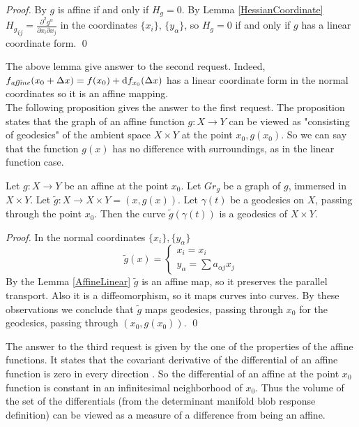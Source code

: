 \documentclass[twocolumn]{svjour3}          %
\newcommand{\affine}{\mathop{\it affine}}
\newcommand{\delx}{\Delta x}
\newcommand{\Diff}{\mathrm{d}}
\begin{document}
\begin{proof}
By \cite{GeodesicMaps} $g$ is affine if and only if $H_g = 0$. By Lemma \ref{HessianCoordinate} ${H_g}_{ij} = \frac{\partial^2 g^{\alpha}}{\partial x_i \partial x_j}$ in the coordinates  $\{x_i\}$, $\{y_{\alpha}\}$, so $H_g = 0$ if and only if $g$ has a linear coordinate form. \qed
\end{proof}

The above lemma give answer to the second request. Indeed, $f_{\affine}(x_0 + \delx)=f(x_0) + \Diff f_{x_0}(\delx)$ has a linear coordinate form in the normal coordinates so it is an affine mapping.
\\
The following proposition gives the answer to the first request. The proposition states that the graph of an affine function $g:X\to Y$ can be viewed as "consisting of geodesics" of the ambient space $X \times Y$ at the point $x_0, g(x_0)$. So we can say that the function $g(x)$ has no difference with surroundings, as in the linear function case.

\begin{proposition} \label{AffineCurv}
Let $g:X\to Y$ be an affine at the point $x_0$. Let $Gr_g$ be a graph of $g$, immersed in $X \times Y$. Let $\tilde{g}:X\to X \times Y = (x, g(x))$. Let $\gamma(t)$ be a geodesics on $X$, passing through the point $x_0$. Then the curve $\tilde{g}(\gamma(t))$ is a geodesics of $X \times Y$.
\end{proposition}
\begin{proof}
In the normal coordinates $\{x_i\}, \{y_{\alpha}\}$ 
$$\tilde{g}(x)= \begin{cases} 
      x_i = x_i \\
      y_{\alpha} = \sum a_{{\alpha}j} x_j 
   \end{cases}$$
By the Lemma \ref{AffineLinear} $\tilde{g}$ is an affine map, so it preserves the parallel transport. Also it is a diffeomorphism, so it maps curves into curves. By these observations we conclude that $\tilde{g}$ maps geodesics, passing through $x_0$ for the geodesics, passing through $(x_0, g(x_0))$. \qed
\end{proof}

The answer to the third request is given by the one of the properties of the affine functions. It states that the covariant derivative of the differential of an affine function is zero in every direction \cite{GeodesicMaps}. So the differential of an affine at the point $x_0$ function is constant in an infinitesimal neighborhood of $x_0$. Thus the volume of the set of the differentials (from the determinant manifold blob response definition) can be viewed as a measure of a difference from being an affine.
\end{document}
